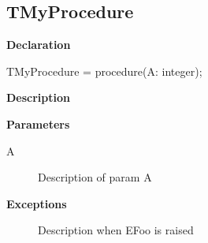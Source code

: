 \documentclass{report}
\begin{document}
\subsection*{TMyProcedure}
\begin{list}{}{
\setlength{\itemindent}{0cm}
\setlength{\listparindent}{0cm}
\setlength{\leftmargin}{\evensidemargin}
\addtolength{\leftmargin}{\tmplength}
\settowidth{\labelsep}{X}
\addtolength{\leftmargin}{\labelsep}
\setlength{\labelwidth}{\tmplength}
}
\begin{flushleft}
\item[\textbf{Declaration}\hfill]
\begin{ttfamily}
TMyProcedure = procedure(A: integer);\end{ttfamily}


\end{flushleft}
\par
\item[\textbf{Description}]
 \par
\item[\textbf{Parameters}]
\begin{description}
\item[A] Description of param A
\end{description}
\item[\textbf{Exceptions}]
\begin{description}
\item[\begin{ttfamily}EFoo\end{ttfamily}(\ref{ok_param_raises_returns_proctype.EFoo})] Description when EFoo is raised
\end{description}


\end{list}
\end{document}
